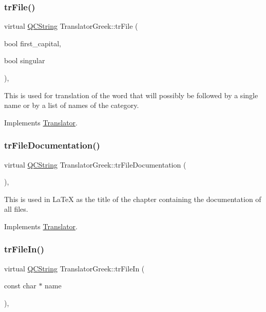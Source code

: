 \subsubsection{\texorpdfstring{trFile()}{trFile()}}
{\footnotesize\ttfamily virtual \mbox{\hyperlink{class_q_c_string}{Q\+C\+String}} Translator\+Greek\+::tr\+File (\begin{DoxyParamCaption}\item[{bool}]{first\+\_\+capital,  }\item[{bool}]{singular }\end{DoxyParamCaption})\hspace{0.3cm}{\ttfamily [inline]}, {\ttfamily [virtual]}}

This is used for translation of the word that will possibly be followed by a single name or by a list of names of the category. 

Implements \mbox{\hyperlink{class_translator}{Translator}}.

\mbox{\label{class_translator_greek_ac6d05e86fd82dc01932c65e15962397d}} 
\subsubsection{\texorpdfstring{trFileDocumentation()}{trFileDocumentation()}}
{\footnotesize\ttfamily virtual \mbox{\hyperlink{class_q_c_string}{Q\+C\+String}} Translator\+Greek\+::tr\+File\+Documentation (\begin{DoxyParamCaption}{ }\end{DoxyParamCaption})\hspace{0.3cm}{\ttfamily [inline]}, {\ttfamily [virtual]}}

This is used in La\+TeX as the title of the chapter containing the documentation of all files. 

Implements \mbox{\hyperlink{class_translator}{Translator}}.

\mbox{\label{class_translator_greek_a2ca75097a0f313bcf5e2cc98799edd83}} 
\subsubsection{\texorpdfstring{trFileIn()}{trFileIn()}}
{\footnotesize\ttfamily virtual \mbox{\hyperlink{class_q_c_string}{Q\+C\+String}} Translator\+Greek\+::tr\+File\+In (\begin{DoxyParamCaption}\item[{const char $\ast$}]{name }\end{DoxyParamCaption})\hspace{0.3cm}{\ttfamily [inline]}, {\ttfamily [virtual]}}

